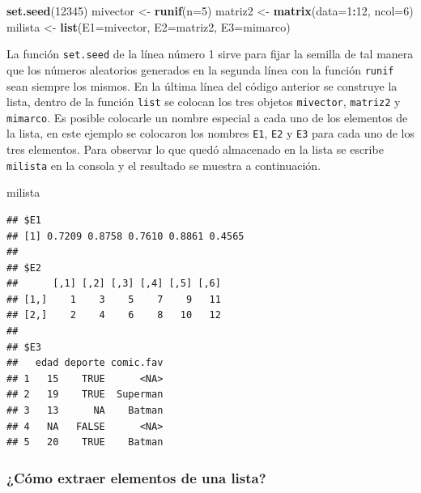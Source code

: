 \documentclass[10pt,]{krantz}
\makeatletter
\newenvironment{Shaded}{\begin{snugshade}}{\end{snugshade}}
\newcommand{\KeywordTok}[1]{\textcolor[rgb]{0.13,0.29,0.53}{\textbf{#1}}}
\newcommand{\DataTypeTok}[1]{\textcolor[rgb]{0.13,0.29,0.53}{#1}}
\newcommand{\DecValTok}[1]{\textcolor[rgb]{0.00,0.00,0.81}{#1}}
\newcommand{\StringTok}[1]{\textcolor[rgb]{0.31,0.60,0.02}{#1}}
\newcommand{\OperatorTok}[1]{\textcolor[rgb]{0.81,0.36,0.00}{\textbf{#1}}}
\newcommand{\NormalTok}[1]{#1}
\newenvironment{kframe}{%
\medskip{}
\setlength{\fboxsep}{.8em}
 \def\at@end@of@kframe{}%
 \ifinner\ifhmode%
  \def\at@end@of@kframe{\end{minipage}}%
  \begin{minipage}{\columnwidth}%
 \fi\fi%
 \def\FrameCommand##1{\hskip\@totalleftmargin \hskip-\fboxsep
 \colorbox{shadecolor}{##1}\hskip-\fboxsep
     \hskip-\linewidth \hskip-\@totalleftmargin \hskip\columnwidth}%
 \MakeFramed {\advance\hsize-\width
   \@totalleftmargin\z@ \linewidth\hsize
   \@setminipage}}%
 {\par\unskip\endMakeFramed%
 \at@end@of@kframe}
\renewenvironment{Shaded}{\begin{kframe}}{\end{kframe}}
\makeatother
\begin{document}
\begin{Shaded}
\begin{Highlighting}[]
\KeywordTok{set.seed}\NormalTok{(}\DecValTok{12345}\NormalTok{)}
\NormalTok{mivector <-}\StringTok{ }\KeywordTok{runif}\NormalTok{(}\DataTypeTok{n=}\DecValTok{5}\NormalTok{)}
\NormalTok{matriz2 <-}\StringTok{ }\KeywordTok{matrix}\NormalTok{(}\DataTypeTok{data=}\DecValTok{1}\OperatorTok{:}\DecValTok{12}\NormalTok{, }\DataTypeTok{ncol=}\DecValTok{6}\NormalTok{)}
\NormalTok{milista <-}\StringTok{ }\KeywordTok{list}\NormalTok{(}\DataTypeTok{E1=}\NormalTok{mivector, }\DataTypeTok{E2=}\NormalTok{matriz2, }\DataTypeTok{E3=}\NormalTok{mimarco)}
\end{Highlighting}
\end{Shaded}

La función \texttt{set.seed} de la línea número 1 sirve para fijar la
semilla de tal manera que los números aleatorios generados en la segunda
línea con la función \texttt{runif} sean siempre los mismos. En la
última línea del código anterior se construye la lista, dentro de la
función \texttt{list} se colocan los tres objetos \texttt{mivector},
\texttt{matriz2} y \texttt{mimarco}. Es posible colocarle un nombre
especial a cada uno de los elementos de la lista, en este ejemplo se
colocaron los nombres \texttt{E1}, \texttt{E2} y \texttt{E3} para cada
uno de los tres elementos. Para observar lo que quedó almacenado en la
lista se escribe \texttt{milista} en la consola y el resultado se
muestra a continuación.

\begin{Shaded}
\begin{Highlighting}[]
\NormalTok{milista}
\end{Highlighting}
\end{Shaded}

\begin{verbatim}
## $E1
## [1] 0.7209 0.8758 0.7610 0.8861 0.4565
## 
## $E2
##      [,1] [,2] [,3] [,4] [,5] [,6]
## [1,]    1    3    5    7    9   11
## [2,]    2    4    6    8   10   12
## 
## $E3
##   edad deporte comic.fav
## 1   15    TRUE      <NA>
## 2   19    TRUE  Superman
## 3   13      NA    Batman
## 4   NA   FALSE      <NA>
## 5   20    TRUE    Batman
\end{verbatim}

\subsubsection{¿Cómo extraer elementos de una
lista?}\label{como-extraer-elementos-de-una-lista}
\end{document}
